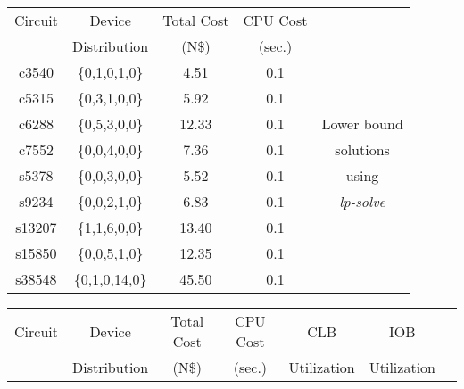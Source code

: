 \begin{table}[hpbt]
\begin{center}
\begin{tabular}{|c|c|c|c|c|}\hline
 Circuit      &Device         &Total Cost   &CPU Cost  &\hfill  \\
 \hfill       &Distribution   &(N\$)        &(sec.)    &\hfill \\ \cline{1-4}\cline{1-4}
 c3540        &\{0,1,0,1,0\}  &4.51         & 0.1      &\hfill \\ \cline{1-4}
 c5315        &\{0,3,1,0,0\}  &5.92         & 0.1      &\hfill \\ \cline{1-4}
 c6288        &\{0,5,3,0,0\}  &12.33        & 0.1      &Lower bound  \\ \cline{1-4}
 c7552        &\{0,0,4,0,0\}  &7.36         & 0.1      &solutions   \\ \cline{1-4}
 s5378        &\{0,0,3,0,0\}  &5.52         & 0.1      &using  \\ \cline{1-4}
 s9234        &\{0,0,2,1,0\}  &6.83         & 0.1      &{\sl lp-solve} \\ \cline{1-4}
 s13207       &\{1,1,6,0,0\}  &13.40        & 0.1      &\hfill \\ \cline{1-4}
 s15850       &\{0,0,5,1,0\}  &12.35        & 0.1      &\hfill \\ \cline{1-4}
 s38548       &\{0,1,0,14,0\} &45.50        & 0.1      &\hfill \\ \hline
\end{tabular}
\end{center}

\vspace*{5mm}
\begin{center}
\begin{tabular}{|c|c|c|c|c|c|c|}\hline
 Circuit      &Device         &Total Cost   &CPU Cost  &CLB           &IOB         & \hfill \\
 \hfill       &Distribution   & (N\$)        &(sec.)    &Utilization   &Utilization & \hfill \\
\cline{1-6} \cline{1-6}


\end{tabular}
\end{center}
\end{table}
